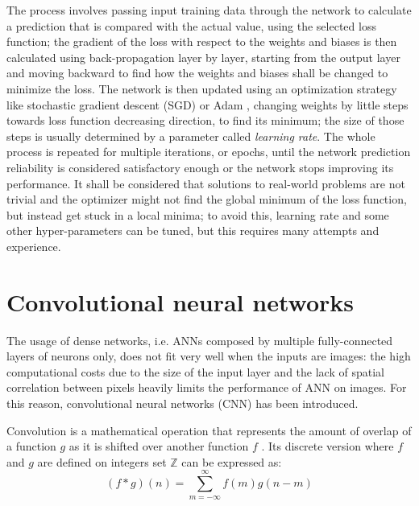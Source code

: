 The process involves passing input training data through the network to calculate a prediction that is compared with the actual value, using the selected loss function; the gradient of the loss with respect to the weights and biases is then calculated using back-propagation \cite{rumelhart1986learning} layer by layer, starting from the output layer and moving backward to find how the weights and biases shall be changed to minimize the loss.
The network is then updated using an optimization strategy like stochastic gradient descent (SGD) or Adam \cite{kingma2014}, changing weights by little steps towards loss function decreasing direction, to find its minimum; the size of those steps is usually determined by a parameter called \emph{learning rate}.
The whole process is repeated for multiple iterations, or epochs, until the network prediction reliability is considered satisfactory enough or the network stops improving its performance.
It shall be considered that solutions to real-world problems are not trivial and the optimizer might not find the global minimum of the loss function, but instead get stuck in a local minima; to avoid this, learning rate and some other hyper-parameters can be tuned, but this requires many attempts and experience.


\section{Convolutional neural networks}
The usage of dense networks, i.e. ANNs composed by multiple fully-connected layers of neurons only, does not fit very well when the inputs are images: the high computational costs due to the size of the input layer and the lack of spatial correlation between pixels heavily limits the performance of ANN on images.
For this reason, convolutional neural networks (CNN) has been introduced.

Convolution is a mathematical operation that represents the amount of overlap of a function $g$ as it is shifted over another function $f$ \cite{wolfram_conv}.
Its discrete version where $f$ and $g$ are defined on integers set $\mathbb{Z}$ can be expressed as:
\begin{equation}
    (f * g)(n) = \sum\limits_{m=-\infty}^\infty f(m)g(n-m)
    \label{eqn:convolution}
\end{equation}

